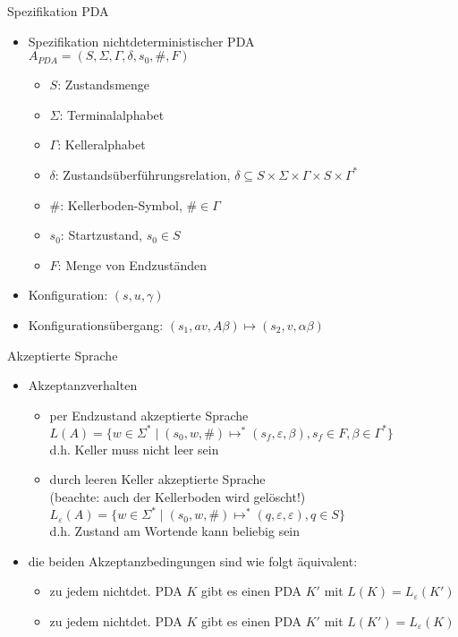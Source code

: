 \begin{frame}{Spezifikation PDA}
	\begin{itemize}
		\item Spezifikation nichtdeterministischer PDA\\
		$A_{PDA}=(S, \Sigma, \Gamma, \delta, s_0, \#, F)$
		\begin{itemize}
			\item $S$: Zustandsmenge
			\item $\Sigma$: Terminalalphabet
			\item $\Gamma$: Kelleralphabet
			\item $\delta$: Zustandsüberführungsrelation, $\delta \subseteq S \times \Sigma \times \Gamma \times S \times \Gamma^*$
			\item $\#$: Kellerboden-Symbol, $\# \in \Gamma$
			\item $s_0$: Startzustand, $s_0 \in S$
			\item $F$: Menge von Endzuständen
		\end{itemize}
		\item Konfiguration: $(s, u, \gamma)$
		\item Konfigurationsübergang: $(s_1, av, A\beta) \mapsto (s_2, v, \alpha\beta)$
	\end{itemize}
	\centering
\end{frame}

\begin{frame}{Akzeptierte Sprache}
	\begin{itemize}
		\item Akzeptanzverhalten
		\begin{itemize}
			\item per Endzustand akzeptierte Sprache\\
			$L(A)=\{w \in \Sigma^* \mid (s_0, w, \#) \mapsto^* (s_f, \varepsilon, \beta), s_f \in F, \beta \in \Gamma^*\}$\\
			d.h. Keller muss nicht leer sein
			\item durch leeren Keller akzeptierte Sprache\\
			(beachte: auch der Kellerboden wird gelöscht!)\\
			$L_\varepsilon(A)=\{w \in \Sigma^*\mid (s_0, w, \#) \mapsto^* (q, \varepsilon, \varepsilon), q \in S\}$\\
			d.h. Zustand am Wortende kann beliebig sein
		\end{itemize}
		\item die beiden Akzeptanzbedingungen sind wie folgt äquivalent:
		\begin{itemize}
			\item zu jedem nichtdet. PDA $K$ gibt es einen PDA $K'$ mit $L(K) = L_\varepsilon(K')$
			\item zu jedem nichtdet. PDA $K$ gibt es einen PDA $K'$ mit $L(K') = L_\varepsilon(K)$
		\end{itemize}
	\end{itemize}
\end{frame}

